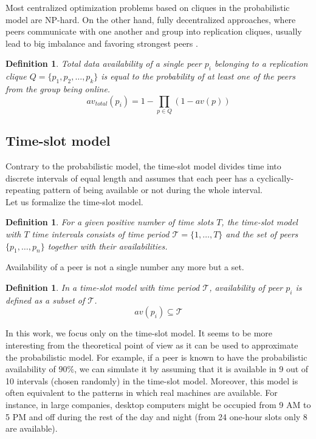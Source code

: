 \documentclass{pracamgren}
\newcounter{collective_ctr} \numberwithin{collective_ctr}{chapter}
\newtheorem{definition}[collective_ctr]{Definition}
\begin{document}
Most centralized optimization problems based on cliques in the probabilistic model are NP-hard. On the other hand, fully decentralized approaches, where peers communicate with one another and group into replication cliques, usually lead to big imbalance and favoring strongest peers \cite{krz}.\\

\begin{definition}
Total data availability of a single peer $p_i$ belonging to a replication clique $Q =\{p_{1}, p_{2}, \ldots, p_{k}\}$ is equal to the probability of at least one of the peers from the group being online.
$$av_{total}(p_i) = 1 - \prod_{p \in Q} (1 - av(p))$$
\end{definition}

\subsection{Time-slot model}\label{sect:timeslot}

Contrary to the probabilistic model, the time-slot model divides time into discrete intervals of equal length and assumes that each peer has a cyclically-repeating pattern of being available or not during the whole interval.\\

Let us formalize the time-slot model.
\begin{definition}
For a given positive number of time slots $T$, the time-slot model with $T$ time intervals consists of time period $\mathcal{T} = \{1,\ldots,T\}$ and the set of peers $\{p_1,\ldots,p_n\}$ together with their availabilities.\\
\end{definition}

Availability of a peer is not a single number any more but a set.\\

\begin{definition}
In a time-slot model with time period $\mathcal{T}$, availability of peer $p_i$ is defined as a subset of $\mathcal{T}$.
$$av(p_i) \subseteq\mathcal{T}$$
\end{definition}

In this work, we focus only on the time-slot model. It seems to be more interesting from the theoretical point of view as it can be used to approximate the probabilistic model. For example, if a peer is known to have the probabilistic availability of $90\%$, we can simulate it by assuming that it is available in 9 out of 10 intervals (chosen randomly) in the time-slot model. Moreover, this model is often equivalent to the patterns in which real machines are available. For instance, in large companies, desktop computers might be occupied from 9 AM to 5 PM and off during the rest of the day and night (from 24 one-hour slots only 8 are available).\\
\end{document}
